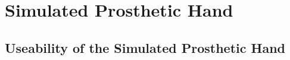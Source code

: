 \documentclass[../main.tex]{subfiles}
\begin{document}




\newpage
\section{Simulated Prosthetic Hand}
\label{sec:simtest}

\subsection{Useability of the Simulated Prosthetic Hand}
\end{document}
